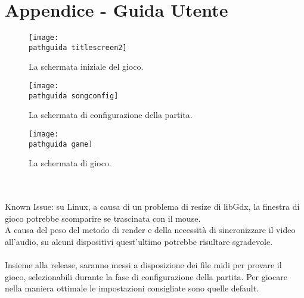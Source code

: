 \documentclass[a4paper,12pt]{report}
\newcommand\pathguida{img/guidautente/}
\begin{document}
\chapter{Appendice - Guida Utente}
\begin{figure}[!htb]
	\centerline{\texttt{[image: \\pathguida titlescreen2]}}
	\caption{La schermata iniziale del gioco.}
	\label{img:title}
\end{figure}
\clearpage \hfill\break
\begin{figure}[!htb]
	\centerline{\texttt{[image: \\pathguida songconfig]}}
	\caption{La schermata di configurazione della partita.}
	\label{img:select}
\end{figure}
\clearpage \hfill\break
\begin{figure}[!htb]
	\centerline{\texttt{[image: \\pathguida game]}}
	\caption{La schermata di gioco.}
	\label{img:game}
\end{figure} \\ \\
Known Issue: su Linux, a causa di un problema di resize di libGdx, la finestra di gioco potrebbe scomparire se trascinata con il mouse. \\ A causa del peso del metodo di render e della necessità di sincronizzare il video all'audio, su alcuni dispositivi quest'ultimo potrebbe risultare sgradevole. \\ \\ Insieme alla release, saranno messi a disposizione dei file midi per provare il gioco, selezionabili durante la fase di configurazione della partita. Per giocare nella maniera ottimale le impostazioni consigliate sono quelle default.
\end{document}
